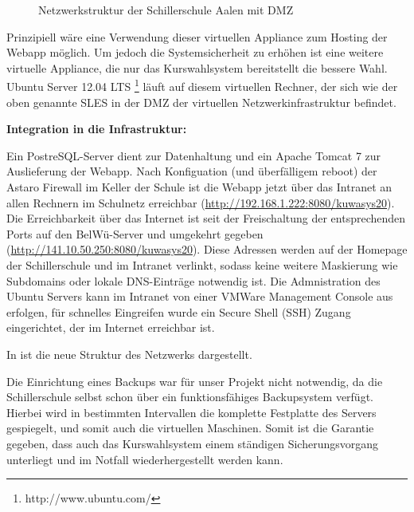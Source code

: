 \documentclass[12pt, twoside, a4paper, ngerman]{article}
\newcommand{\iz}[2]{#1 {\renewcommand{\baselinestretch}{1}\footnote{#2}}} %
\renewcommand{\baselinestretch}{1.5}
\begin{document}
\begin{figure}[H]
\begin{center}
\end{center}
\caption[\textbf{Netzwerkstruktur der Schillerschule Aalen}]{Netzwerkstruktur der Schillerschule Aalen mit DMZ}
\label{fig:Netzwerkstruktur}
\end{figure}

Prinzipiell wäre eine Verwendung dieser virtuellen \gls{Appliance} zum Hosting der \ac{Webapp} möglich. Um jedoch die Systemsicherheit zu erhöhen ist eine weitere virtuelle Appliance, die nur das Kurswahlsystem bereitstellt die bessere Wahl.
\iz{Ubuntu Server 12.04 LTS}{http://www.ubuntu.com/} läuft auf diesem virtuellen Rechner, der sich wie der oben genannte SLES in der \gls{DMZ} der virtuellen Netzwerkinfrastruktur befindet.

\textbf{Integration in die Infrastruktur:}

Ein PostreSQL-Server dient zur Datenhaltung und ein Apache Tomcat 7 zur Auslieferung der \ac{Webapp}. Nach Konfiguation (und überfälligem reboot) der Astaro Firewall im Keller der Schule ist die Webapp jetzt über das Intranet an allen Rechnern im Schulnetz erreichbar (\url{http://192.168.1.222:8080/kuwasys20}). Die Erreichbarkeit über das Internet ist seit der Freischaltung der entsprechenden Ports auf den BelWü-Server und umgekehrt gegeben (\url{http://141.10.50.250:8080/kuwasys20}).
Diese Adressen werden auf der Homepage der Schillerschule und im Intranet verlinkt, sodass keine weitere Maskierung wie Subdomains oder lokale DNS-Einträge notwendig ist.
Die Admnistration des Ubuntu Servers kann im Intranet von einer VMWare Management Console aus erfolgen, für schnelles Eingreifen wurde ein \gls{Secure Shell} (SSH) Zugang eingerichtet, der im Internet erreichbar ist.

In  ist die neue Struktur des Netzwerks dargestellt.

Die Einrichtung eines Backups war für unser Projekt nicht notwendig, da die Schillerschule selbst schon über ein funktionsfähiges Backupsystem verfügt. Hierbei wird in bestimmten Intervallen die komplette Festplatte des Servers gespiegelt, und somit auch die virtuellen Maschinen.
Somit ist die Garantie gegeben, dass auch das Kurswahlsystem einem ständigen Sicherungsvorgang unterliegt und im Notfall wiederhergestellt werden kann.
\newpage
\end{document}
